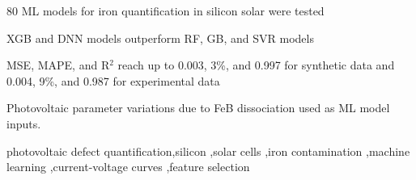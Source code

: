 \documentclass[a4paper,fleqn]{cas-sc}
\begin{document}
\begin{highlights}
\item 80 ML models for iron quantification in silicon solar were tested
\item XGB and DNN  models outperform RF, GB, and SVR models
\item MSE, MAPE, and R$^2$ reach up to 0.003, 3\%, and 0.997 for synthetic data and 0.004, 9\%, and 0.987 for experimental data
\item Photovoltaic parameter variations due to FeB dissociation used as ML model inputs.
\end{highlights}



\begin{keywords}
photovoltaic defect quantification\sep silicon \sep solar cells \sep iron contamination \sep machine learning \sep current-voltage curves \sep feature selection
\end{keywords}


\maketitle

\end{document}
